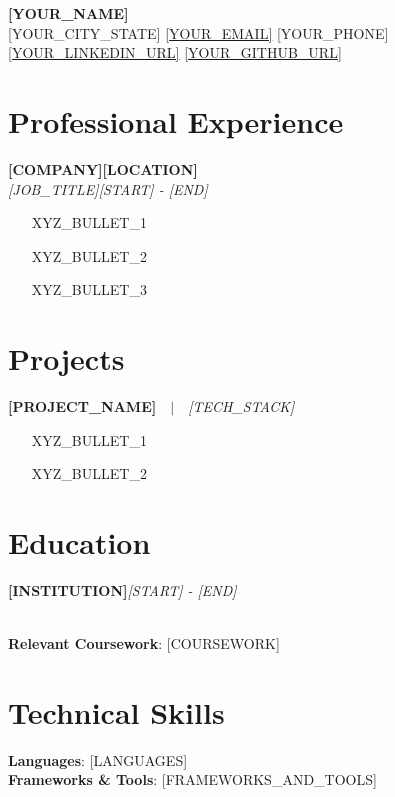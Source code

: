 \documentclass[letterpaper,11pt]{article}
\newcommand{\jobentry}[4]{%
  \textbf{#1}\hfill\textbf{#2}\\
  \textit{#3}\hfill\textit{#4}\par\vspace{1pt}}
\newcommand{\projectentry}[2]{\textbf{#1}\ \ $|$\ \ \textit{#2}\par\vspace{1pt}}
\newcommand{\eduentry}[2]{\textbf{#1}\hfill\textit{#2}\par}
\newcommand{\entrygap}{\vspace{4pt}}
\begin{document}
\begin{center}
  {\fontsize{22pt}{24pt}\selectfont\textbf{[YOUR_NAME]}}\\[3pt]
  [YOUR_CITY_STATE] \textbullet{} \href{mailto:[YOUR_EMAIL]}{[YOUR_EMAIL]} \textbullet{} [YOUR_PHONE] \textbullet{} \href{https://[YOUR_LINKEDIN_URL]}{[YOUR_LINKEDIN_URL]} \textbullet{} \href{https://[YOUR_GITHUB_URL]}{[YOUR_GITHUB_URL]}
\end{center}

\section{Professional Experience}

\jobentry{[COMPANY]}{[LOCATION]}{[JOB_TITLE]}{[START] - [END]}
\begin{itemize}
  \item [XYZ_BULLET_1]
  \item [XYZ_BULLET_2]
  \item [XYZ_BULLET_3]
\end{itemize}
\entrygap

\section{Projects}

\projectentry{[PROJECT_NAME]}{[TECH_STACK]}
\begin{itemize}
  \item [XYZ_BULLET_1]
  \item [XYZ_BULLET_2]
\end{itemize}

\section{Education}

\eduentry{[INSTITUTION]}{[START] - [END]}
[DEGREE]\\
\textbf{Relevant Coursework}: [COURSEWORK]

\section{Technical Skills}

\textbf{Languages}: [LANGUAGES]\\
\textbf{Frameworks \& Tools}: [FRAMEWORKS_AND_TOOLS]
\end{document}
